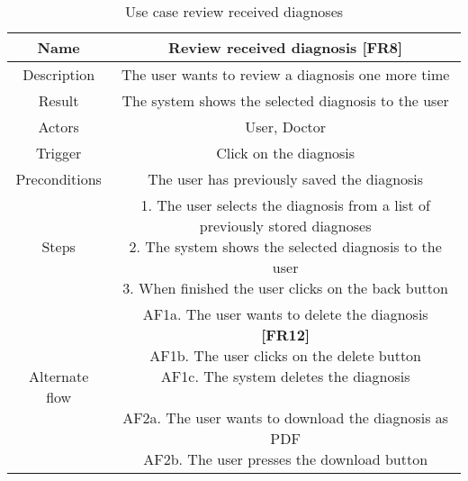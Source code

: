 \begin{table}[H]
	\begin{center}\scriptsize
		\def\arraystretch{2}%
		\begin{tabular}{ c|c } 
			\hline
			Name & Review received diagnosis \textbf{[FR8]}\\
			\hline	
			Description & The user wants to review a diagnosis one more time \\ 
			\hline
			Result & The system shows the selected diagnosis to the user\\ 
			\hline
			Actors & User, Doctor \\ 
			\hline
			Trigger & Click on the diagnosis \\ 
			\hline
			Preconditions & The user has previously saved the diagnosis \\ 
			\hline
			Steps & \parbox{9cm}{\vspace{.5\baselineskip}1. The user selects the diagnosis from a list of previously stored diagnoses\\2. The system shows the selected diagnosis to the user \\ 3. When finished the user clicks on the back button}\\
			\hline
			Alternate flow & \parbox{9cm}{\vspace{.5\baselineskip}
				AF1a. The user wants to delete the diagnosis \textbf{[FR12]}\\
				AF1b. The user clicks on the delete button\\
				AF1c. The system deletes the diagnosis\\\\
				AF2a. The user wants to download the diagnosis as PDF\\
				AF2b. The user presses the download button}\\
			\hline
		\end{tabular}\normalsize
	\end{center}
	\caption{Use case review received diagnoses}
\end{table}
